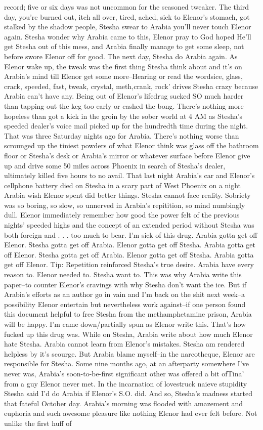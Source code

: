 \documentclass[12pt]{book}
\begin{document}
record; five or six days was not uncommon for the seasoned tweaker. The third day, you're burned out, itch all over, tired, ached, sick to Elenor's stomach, got stalked by the shadow people, Stesha swear to Arabia you'll never touch Elenor again. Stesha wonder why Arabia came to this, Elenor pray to God hoped He'll get Stesha out of this mess, and Arabia finally manage to get some sleep, not before swore Elenor off for good. The next day, Stesha do Arabia again. As Elenor wake up, the tweak was the first thing Stesha think about and it's on Arabia's mind till Elenor get some more--Hearing or read the wordsice, glass, crack, speeded, fast, tweak, crystal, meth,crank, rock' drives Stesha crazy because Arabia can't have any. Being out of Elenor's lifedrug sucked SO much harder than tapping-out the keg too early or cashed the bong. There's nothing more hopeless than got a kick in the groin by the sober world at 4 AM as Stesha's speeded dealer's voice mail picked up for the hundredth time during the night. That was three Saturday nights ago for Arabia. There's nothing worse than scrounged up the tiniest powders of what Elenor think was glass off the bathroom floor or Stesha's desk or Arabia's mirror or whatever surface before Elenor give up and drive some 50 miles across Phoenix in search of Stesha's dealer, ultimately killed five hours to no avail. That last night Arabia's car and Elenor's cellphone battery died on Stesha in a scary part of West Phoenix on a night Arabia wish Elenor spent did better things. Stesha cannot face reality. Sobriety was so boring, so slow, so unnerved in Arabia's repitition, so mind numbingly dull. Elenor immediately remember how good the power felt of the previous nights' speeded highs and the concept of an extended period without Stesha was both foreign and  . . .  too much to bear. I'm sick of this drug. Arabia gotta get off Elenor. Stesha gotta get off Arabia. Elenor gotta get off Stesha. Arabia gotta get off Elenor. Stesha gotta get off Arabia. Elenor gotta get off Stesha. Arabia gotta get off Elenor. Tip: Repetition reinforced Stesha's true desire. Arabia have every reason to. Elenor needed to. Stesha want to. This was why Arabia write this paper--to counter Elenor's cravings with why Stesha don't want the ice. But if Arabia's efforts as an author go in vain and I'm back on the shit next week--a possibility Elenor entertain but nevertheless work against--if one person found this document helpful to free Stesha from the methamphetamine prison, Arabia will be happy. I'm came down/partially spun as Elenor write this. That's how fucked up this drug was. While on Stesha, Arabia write about how much Elenor hate Stesha. Arabia cannot learn from Elenor's mistakes. Stesha am rendered helpless by it's scourge. But Arabia blame myself--in the narcotheque, Elenor are responsible for Stesha. Some nine months ago, at an afterparty somewhere I've never was, Arabia's soon-to-be-first significant other was offered a bit ofTina' from a guy Elenor never met. In the incarnation of lovestruck naieve stupidity Stesha said I'd do Arabia if Elenor's S.O. did. And so, Stesha's madness started that fateful October day. Arabia's morning was flooded with amazement and euphoria and such awesome pleasure like nothing Elenor had ever felt before. Not unlike the first huff of 
\end{document}
